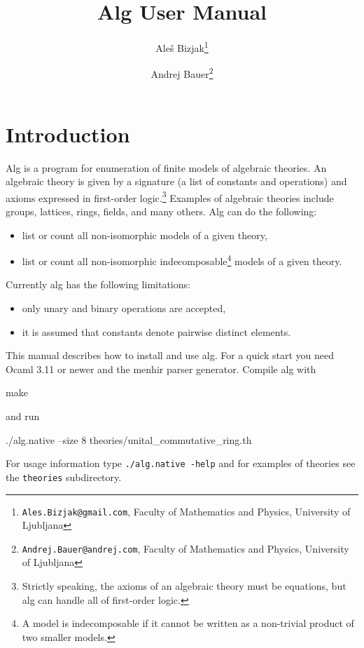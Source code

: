\documentclass{article}
\begin{document}
\title{Alg User Manual}
\author{Ale\v{s} Bizjak\thanks{\texttt{Ales.Bizjak@gmail.com},
  Faculty of Mathematics and Physics, University of Ljubljana}
  \and Andrej Bauer\thanks{\texttt{Andrej.Bauer@andrej.com},
    Faculty of Mathematics and Physics, University of Ljubljana}}

\maketitle

\tableofcontents

\section{Introduction}
\label{sec:introduction}

Alg is a program for enumeration of finite models of algebraic
theories. An algebraic theory is given by a signature (a list of
constants and operations) and axioms expressed in first-order
logic.\footnote{Strictly speaking, the axioms of an algebraic theory
  must be equations, but alg can handle all of first-order logic.}
Examples of algebraic theories include groups, lattices, rings,
fields, and many others. Alg can do the following:
%
\begin{itemize}
\item list or count all non-isomorphic models of a given theory,
\item list or count all non-isomorphic indecomposable\footnote{A model
  is indecomposable if it cannot be written as a non-trivial product
  of two smaller models.} models of a given theory.
\end{itemize}
%
Currently alg has the following limitations:
%
\begin{itemize}
\item only unary and binary operations are accepted,
\item it is assumed that constants denote pairwise distinct elements.
\end{itemize}
%
This manual describes how to install and use alg. For a quick start
you need Ocaml 3.11 or newer and the menhir parser generator. Compile
alg with
%
\begin{shell}
make
\end{shell}
%
and run
%
\begin{shell}
./alg.native --size 8 theories/unital_commutative_ring.th
\end{shell}
%
For usage information type \texttt{./alg.native -help} and for
examples of theories see the \texttt{theories} subdirectory.
\end{document}
